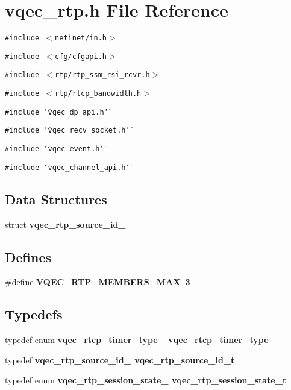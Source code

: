 \section{vqec\_\-rtp.h File Reference}
\label{vqec__rtp_8h}
{\tt \#include $<$netinet/in.h$>$}\par
{\tt \#include $<$cfg/cfgapi.h$>$}\par
{\tt \#include $<$rtp/rtp\_\-ssm\_\-rsi\_\-rcvr.h$>$}\par
{\tt \#include $<$rtp/rtcp\_\-bandwidth.h$>$}\par
{\tt \#include \char`\"{}vqec\_\-dp\_\-api.h\char`\"{}}\par
{\tt \#include \char`\"{}vqec\_\-recv\_\-socket.h\char`\"{}}\par
{\tt \#include \char`\"{}vqec\_\-event.h\char`\"{}}\par
{\tt \#include \char`\"{}vqec\_\-channel\_\-api.h\char`\"{}}\par
\subsection*{Data Structures}
\begin{CompactItemize}
\item 
struct \bf{vqec\_\-rtp\_\-source\_\-id\_\-}
\end{CompactItemize}
\subsection*{Defines}
\begin{CompactItemize}
\item 
\#define \bf{VQEC\_\-RTP\_\-MEMBERS\_\-MAX}~3
\end{CompactItemize}
\subsection*{Typedefs}
\begin{CompactItemize}
\item 
typedef enum \bf{vqec\_\-rtcp\_\-timer\_\-type\_\-} \bf{vqec\_\-rtcp\_\-timer\_\-type}
\item 
typedef \bf{vqec\_\-rtp\_\-source\_\-id\_\-} \bf{vqec\_\-rtp\_\-source\_\-id\_\-t}
\item 
typedef enum \bf{vqec\_\-rtp\_\-session\_\-state\_\-} \bf{vqec\_\-rtp\_\-session\_\-state\_\-t}
\end{CompactItemize}
